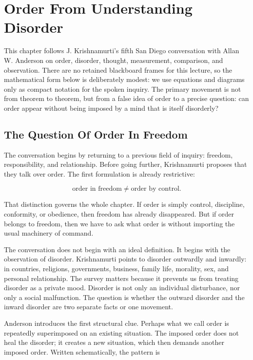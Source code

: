 \chapter{Order From Understanding Disorder}

This chapter follows J. Krishnamurti's fifth San Diego conversation with Allan W. Anderson on order, disorder, thought, measurement, comparison, and observation. There are no retained blackboard frames for this lecture, so the mathematical form below is deliberately modest: we use equations and diagrams only as compact notation for the spoken inquiry. The primary movement is not from theorem to theorem, but from a false idea of order to a precise question: can order appear without being imposed by a mind that is itself disorderly?

\section{The Question Of Order In Freedom}

The conversation begins by returning to a previous field of inquiry: freedom, responsibility, and relationship. Before going further, Krishnamurti proposes that they talk over order. The first formulation is already restrictive:

\begin{equation}
\text{order in freedom} \neq \text{order by control}.
\end{equation}

That distinction governs the whole chapter. If order is simply control, discipline, conformity, or obedience, then freedom has already disappeared. But if order belongs to freedom, then we have to ask what order is without importing the usual machinery of command.

The conversation does not begin with an ideal definition. It begins with the observation of disorder. Krishnamurti points to disorder outwardly and inwardly: in countries, religions, governments, business, family life, morality, sex, and personal relationship. The survey matters because it prevents us from treating disorder as a private mood. Disorder is not only an individual disturbance, nor only a social malfunction. The question is whether the outward disorder and the inward disorder are two separate facts or one movement.

Anderson introduces the first structural clue. Perhaps what we call order is repeatedly superimposed on an existing situation. The imposed order does not heal the disorder; it creates a new situation, which then demands another imposed order. Written schematically, the pattern is

